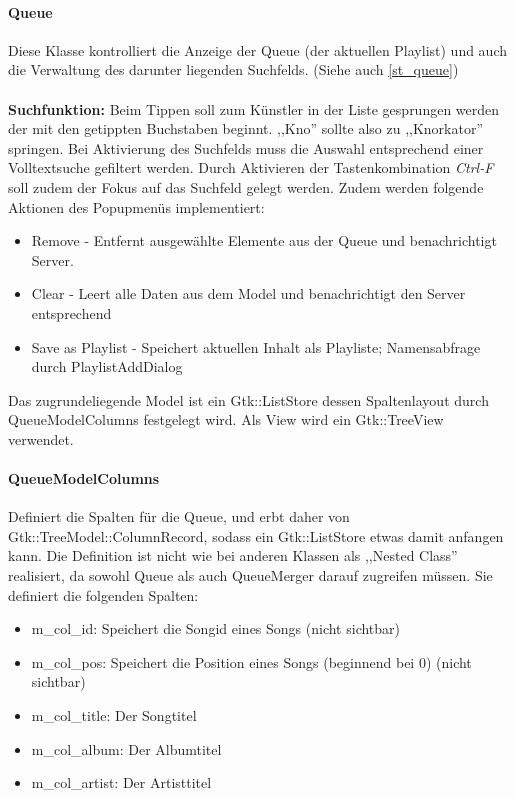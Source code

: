 \paragraph{Queue}
Diese Klasse kontrolliert die Anzeige der Queue (der aktuellen Playlist) und auch die Verwaltung des darunter liegenden Suchfelds.
(Siehe auch \ref{st_queue})
\\
\\
\textbf{Suchfunktion:} Beim Tippen soll zum Künstler in der Liste gesprungen werden der mit den getippten Buchstaben beginnt.
,,Kno'' sollte also zu ,,Knorkator'' springen. Bei Aktivierung des Suchfelds muss die Auswahl entsprechend einer Volltextsuche gefiltert werden. Durch Aktivieren der Tastenkombination \textit{Ctrl-F}
soll zudem der Fokus auf das Suchfeld gelegt werden.
Zudem werden folgende Aktionen des Popupmenüs implementiert:
\begin{itemize}
\item Remove - Entfernt ausgewählte Elemente aus der Queue und benachrichtigt Server.
\item Clear - Leert alle Daten aus dem Model und benachrichtigt den Server entsprechend
\item Save as Playlist - Speichert aktuellen Inhalt als Playliste; Namensabfrage durch PlaylistAddDialog
\end{itemize}

Das zugrundeliegende Model ist ein Gtk::ListStore dessen Spaltenlayout durch QueueModelColumns festgelegt wird.
Als View wird ein Gtk::TreeView verwendet.

\paragraph{QueueModelColumns}
Definiert die Spalten für die Queue, und erbt daher von Gtk::TreeModel::ColumnRecord, sodass ein Gtk::ListStore etwas damit anfangen kann.
Die Definition ist nicht wie bei anderen Klassen als ,,Nested Class'' realisiert, da sowohl Queue als auch QueueMerger darauf zugreifen müssen. 
Sie definiert die folgenden Spalten:
\begin{itemize}
\item m\_col\_id: Speichert die Songid eines Songs (nicht sichtbar)
\item m\_col\_pos: Speichert die Position eines Songs (beginnend bei 0) (nicht sichtbar)
\item m\_col\_title: Der Songtitel
\item m\_col\_album: Der Albumtitel
\item m\_col\_artist: Der Artisttitel
\end{itemize}

